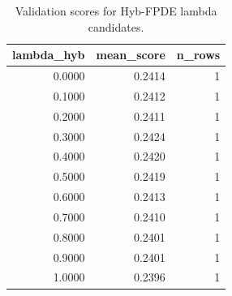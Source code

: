 \begin{table}[t]
\caption{Validation scores for Hyb-FPDE lambda candidates.}
\label{tab:lambda_distribution_computed}
\centering
\begin{tabular}{rrr}
\toprule
lambda\_hyb & mean\_score & n\_rows \\
\midrule
0.0000 & 0.2414 & 1 \\
0.1000 & 0.2412 & 1 \\
0.2000 & 0.2411 & 1 \\
0.3000 & 0.2424 & 1 \\
0.4000 & 0.2420 & 1 \\
0.5000 & 0.2419 & 1 \\
0.6000 & 0.2413 & 1 \\
0.7000 & 0.2410 & 1 \\
0.8000 & 0.2401 & 1 \\
0.9000 & 0.2401 & 1 \\
1.0000 & 0.2396 & 1 \\
\bottomrule
\end{tabular}

\end{table}
